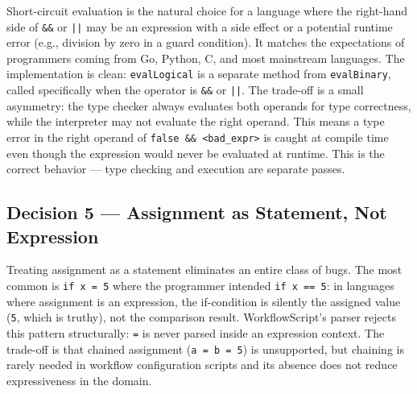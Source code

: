 \documentclass[10pt,a4paper]{article}
\begin{document}
Short-circuit evaluation is the natural choice for a language where the right-hand side of
\texttt{\&\&} or \texttt{||} may be an expression with a side effect or a potential runtime
error (e.g., division by zero in a guard condition). It matches the expectations of
programmers coming from Go, Python, C, and most mainstream languages. The implementation is
clean: \texttt{evalLogical} is a separate method from \texttt{evalBinary}, called specifically
when the operator is \texttt{\&\&} or \texttt{||}. The trade-off is a small asymmetry: the
type checker always evaluates both operands for type correctness, while the interpreter may
not evaluate the right operand. This means a type error in the right operand of
\texttt{false \&\& <bad\_expr>} is caught at compile time even though the expression would
never be evaluated at runtime. This is the correct behavior --- type checking and execution
are separate passes.

\subsection{Decision 5 --- Assignment as Statement, Not Expression}

Treating assignment as a statement eliminates an entire class of bugs. The most common is
\texttt{if x = 5} where the programmer intended \texttt{if x == 5}: in languages where
assignment is an expression, the if-condition is silently the assigned value (\texttt{5},
which is truthy), not the comparison result. WorkflowScript's parser rejects this pattern
structurally: \texttt{=} is never parsed inside an expression context. The trade-off is that
chained assignment (\texttt{a = b = 5}) is unsupported, but chaining is rarely needed in
workflow configuration scripts and its absence does not reduce expressiveness in the domain.
\end{document}
